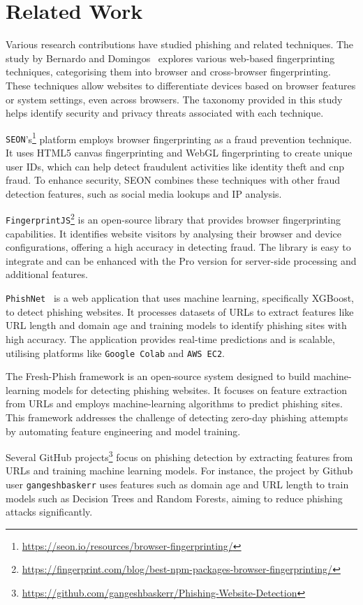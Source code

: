 \section{Related Work} %
\label{sec:related-work}

Various research contributions have studied phishing and related techniques. The study by Bernardo and Domingos~\cite{bernado-domingos:2016} explores various web-based fingerprinting techniques, categorising them into browser and cross-browser fingerprinting. These techniques allow websites to differentiate devices based on browser features or system settings, even across browsers. The taxonomy provided in this study helps identify security and privacy threats associated with each technique. 

{\texttt{SEON}}'s\footnote{\url{https://seon.io/resources/browser-fingerprinting/}} platform employs browser fingerprinting as a fraud prevention technique. It uses HTML5 canvas fingerprinting and WebGL fingerprinting to create unique user IDs, which can help detect fraudulent activities like identity theft and \gls{cnp} fraud. To enhance security, SEON combines these techniques with other fraud detection features, such as social media lookups and IP analysis.

{\texttt{FingerprintJS}}\footnote{\url{https://fingerprint.com/blog/best-npm-packages-browser-fingerprinting/}} is an open-source library that provides browser fingerprinting capabilities. It identifies website visitors by analysing their browser and device configurations, offering a high accuracy in detecting fraud. The library is easy to integrate and can be enhanced with the Pro version for server-side processing and additional features.

{\texttt{PhishNet}}~\cite{kumar-anthony-banga-sohal:2024} is a web application that uses machine learning, specifically XGBoost, to detect phishing websites. It processes datasets of URLs to extract features like URL length and domain age and training models to identify phishing sites with high accuracy. The application provides real-time predictions and is scalable, utilising platforms like {\texttt{Google Colab}} and {\texttt{AWS EC2}}.

The Fresh-Phish framework is an open-source system designed to build machine-learning models for detecting phishing websites. It focuses on feature extraction from URLs and employs machine-learning algorithms to predict phishing sites. This framework addresses the challenge of detecting zero-day phishing attempts by automating feature engineering and model training.

Several GitHub projects\footnote{\url{https://github.com/gangeshbaskerr/Phishing-Website-Detection}} focus on phishing detection by extracting features from URLs and training machine learning models. For instance, the project by Github user {\texttt{gangeshbaskerr}} uses features such as domain age and URL length to train models such as Decision Trees and Random Forests, aiming to reduce phishing attacks significantly.

